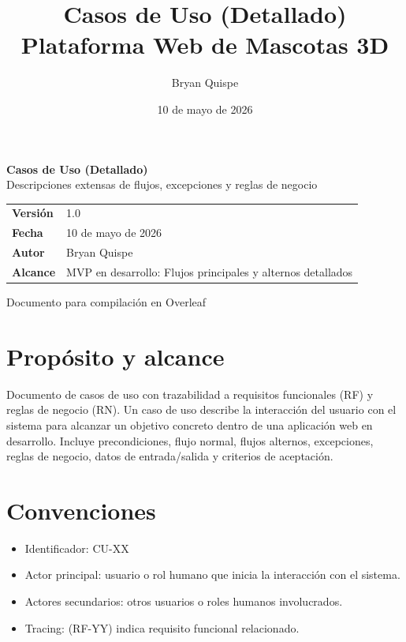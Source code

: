 \documentclass[12pt,a4paper]{article}
\title{\Huge\textbf{Casos de Uso (Detallado)}\\[0.3em]\Large Plataforma Web de Mascotas 3D}
\author{Bryan Quispe}
\date{10 de mayo de 2026}
\begin{document}
\begin{titlepage}
\centering
\vspace*{1.8cm}
{\Huge\bfseries\color{PrimaryBlue} Casos de Uso (Detallado)\\[0.35em]}
{\LARGE Descripciones extensas de flujos, excepciones y reglas de negocio\\[1.2cm]}

\begin{tabular}{p{5cm} p{8cm}}
\rowcolor{SoftGray}
\textbf{Versi\'on} & 1.0 \\
\textbf{Fecha} & 10 de mayo de 2026 \\
\textbf{Autor} & Bryan Quispe \\
\textbf{Alcance} & MVP en desarrollo: Flujos principales y alternos detallados \\
\end{tabular}

\vfill
{\large Documento para compilaci\'on en Overleaf}
\end{titlepage}

\tableofcontents
\newpage

\section{Prop\'osito y alcance}
Documento de casos de uso con trazabilidad a requisitos funcionales (RF) y reglas de negocio (RN). Un caso de uso describe la interacci\'on del usuario con el sistema para alcanzar un objetivo concreto dentro de una aplicaci\'on web en desarrollo. Incluye precondiciones, flujo normal, flujos alternos, excepciones, reglas de negocio, datos de entrada/salida y criterios de aceptaci\'on.

\section{Convenciones}
\begin{itemize}[leftmargin=*]
    \item Identificador: CU-XX
    \item Actor principal: usuario o rol humano que inicia la interacci\'on con el sistema.
    \item Actores secundarios: otros usuarios o roles humanos involucrados.
    \item Tracing: (RF-YY) indica requisito funcional relacionado.
\end{itemize}

\newpage
\end{document}

